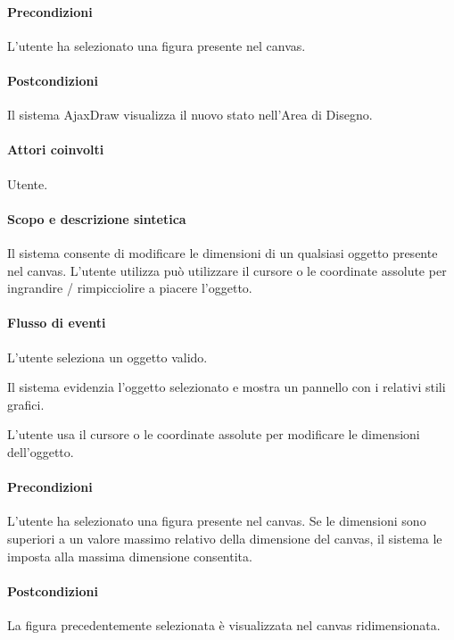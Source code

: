 \paragraph{Precondizioni} L'utente ha selezionato una figura presente nel canvas.
\paragraph{Postcondizioni} Il sistema AjaxDraw visualizza il nuovo stato nell'Area di Disegno.


\paragraph{Attori coinvolti} Utente.
\paragraph{Scopo e descrizione sintetica}  Il sistema consente di modificare le dimensioni  di un qualsiasi oggetto presente nel canvas.  L'utente utilizza pu\`o utilizzare il cursore o le coordinate assolute per ingrandire / rimpicciolire a piacere l'oggetto.
\paragraph{Flusso di eventi}
\begin{elenconumerato}[\textbf{}]{\subsubsecindent}
\item  L'utente seleziona un oggetto valido.
\item  Il sistema evidenzia l'oggetto selezionato e mostra un pannello con i relativi stili grafici.
\item  L'utente usa il cursore o le coordinate assolute per modificare le dimensioni dell'oggetto.
\end{elenconumerato}
\paragraph{Precondizioni} L'utente ha selezionato una figura presente nel canvas. Se le dimensioni sono superiori a un valore massimo relativo della dimensione del canvas, il sistema le imposta alla massima dimensione consentita.
\paragraph{Postcondizioni} La figura precedentemente selezionata \`e visualizzata nel canvas ridimensionata.

